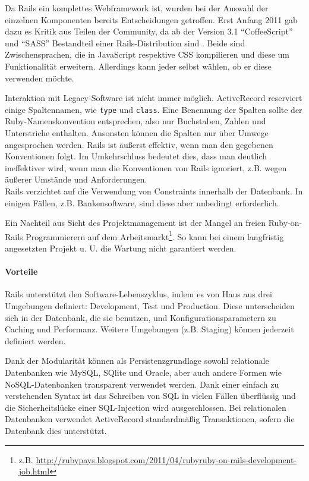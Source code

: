  Da Rails ein komplettes Webframework ist, wurden bei der Auswahl der einzelnen Komponenten bereits Entscheidungen getroffen.  Erst Anfang 2011 gab dazu es Kritik aus Teilen der Community, da ab der Version 3.1 "`CoffeeScript"' und "`SASS"' Bestandteil einer Rails-Distribution sind \citep{peter_cooper_rails_2011}. Beide sind Zwischensprachen, die in JavaScript respektive CSS kompilieren und diese um Funktionalität erweitern. Allerdings kann jeder selbst wählen, ob er diese verwenden möchte.


Interaktion mit Legacy-Software ist nicht immer möglich. ActiveRecord reserviert einige Spaltennamen, wie \texttt{type} und \texttt{class}. Eine Benennung der Spalten sollte der Ruby-Namenskonvention entsprechen, also nur Buchstaben, Zahlen und Unterstriche enthalten. Ansonsten können die Spalten nur über Umwege angesprochen werden. Rails ist äußerst effektiv, wenn man den gegebenen Konventionen folgt. Im Umkehrschluss bedeutet dies, dass man deutlich ineffektiver wird, wenn man die Konventionen von Rails ignoriert, z.B. wegen äußerer Umstände und Anforderungen.\\
Rails verzichtet auf die Verwendung von Constraints innerhalb der Datenbank. In einigen Fällen, z.B. Bankensoftware, sind diese aber unbedingt erforderlich.

Ein Nachteil aus Sicht des Projektmanagement ist der Mangel an freien Ruby-on-Rails Programmierern auf dem Arbeitsmarkt\footnote{z.B. \url{http://rubypays.blogspot.com/2011/04/rubyruby-on-rails-development-job.html}}. So kann bei einem langfristig angesetzten Projekt u. U. die Wartung nicht garantiert werden.

\paragraph{Vorteile}
Rails unterstützt den Software-Lebenszyklus, indem es von Haus aus drei Umgebungen definiert: Development, Test und Production. Diese unterscheiden sich in der Datenbank, die sie benutzen, und Konfigurationsparametern zu Caching und Performanz. Weitere Umgebungen (z.B. Staging) können jederzeit definiert werden.


Dank der Modularität können als Persistenzgrundlage sowohl relationale Datenbanken wie MySQL, SQlite und Oracle, aber auch andere Formen wie NoSQL-Datenbanken transparent verwendet werden. Dank einer einfach zu verstehenden Syntax ist das Schreiben von SQL in vielen Fällen überflüssig und die Sicherheitslücke einer SQL-Injection wird ausgeschlossen. Bei relationalen Datenbanken verwendet ActiveRecord standardmäßig Transaktionen, sofern die Datenbank dies unterstützt.



